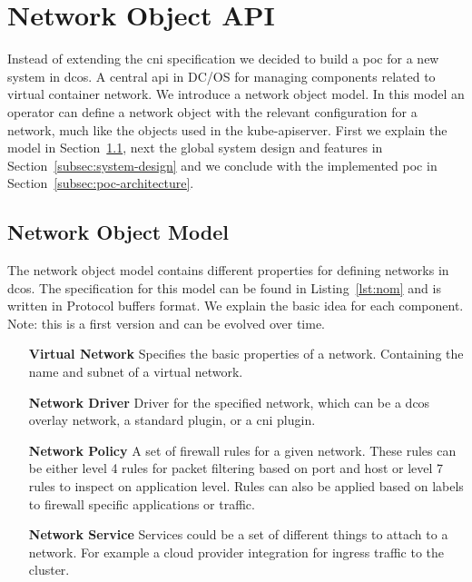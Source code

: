 \section{Network Object API}
\label{sec:networkobject-api}
Instead of extending the \gls{cni} specification we decided to build a \gls{poc} for a new system in \gls{dcos}. A central \gls{api} in DC/OS for managing components related to virtual container network. We introduce a network object model. In this model an operator can define a network object with the relevant configuration for a network, much like the objects used in the kube-apiserver. First we explain the model in Section~\ref{subsec:network-object-model}, next the global system design and features in Section~\ref{subsec:system-design} and we conclude with the implemented \gls{poc} in Section~\ref{subsec:poc-architecture}.

\subsection{Network Object Model}
\label{subsec:network-object-model}
The network object model contains different properties for defining networks in \gls{dcos}. The specification for this model can be found in Listing~\ref{lst:nom} and is written in Protocol buffers format. We explain the basic idea for each component. Note: this is a first version and can be evolved over time.



\begin{itemize}
    \item[\textbf{Virtual Network}] Specifies the basic properties of a network. Containing the name and subnet of a virtual network.
    \item[\textbf{Network Driver}] Driver for the specified network, which can be  a \gls{dcos} overlay network, a standard plugin, or a \gls{cni} plugin.
    \item[\textbf{Network Policy}] A set of firewall rules for a given network. These rules can be either level 4 rules for packet filtering based on port and host or level 7 rules to inspect on application level. Rules can also be applied based on labels to firewall specific applications or traffic.
    \item[\textbf{Network Service}] Services could be a set of different things to attach to a network. For example a cloud provider integration for ingress traffic to the cluster.
\end{itemize}

